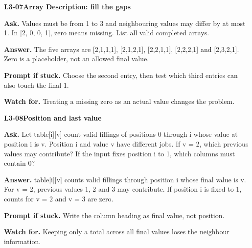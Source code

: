 \documentclass[11pt,a4paper]{article}
\begin{document}
\par\medskip
\noindent\begin{minipage}{\textwidth}
{\color{teal}\textbf{L3-07}}\quad \textbf{Array Description: fill the gaps}\par\smallskip
\textbf{Ask.} Values must be from 1 to 3 and neighbouring values may differ by at most 1. In [2, 0, 0, 1], zero means missing. List all valid completed arrays.\par\smallskip
\textbf{Answer.} The five arrays are [2,1,1,1], [2,1,2,1], [2,2,1,1], [2,2,2,1] and [2,3,2,1]. Zero is a placeholder, not an allowed final value.\par\smallskip
\textbf{Prompt if stuck.} Choose the second entry, then test which third entries can also touch the final 1.\par\smallskip
\textbf{Watch for.} Treating a missing zero as an actual value changes the problem.
\end{minipage}\par{}\medskip

\noindent\begin{minipage}{\textwidth}
{\color{teal}\textbf{L3-08}}\quad \textbf{Position and last value}\par\smallskip
\textbf{Ask.} Let table[i][v] count valid fillings of positions 0 through i whose value at position i is v. Position i and value v have different jobs. If v = 2, which previous values may contribute? If the input fixes position i to 1, which columns must contain 0?\par\smallskip
\textbf{Answer.} table[i][v] counts valid fillings through position i whose final value is v. For v = 2, previous values 1, 2 and 3 may contribute. If position i is fixed to 1, counts for v = 2 and v = 3 are zero.\par\smallskip
\textbf{Prompt if stuck.} Write the column heading as final value, not position.\par\smallskip
\textbf{Watch for.} Keeping only a total across all final values loses the neighbour information.
\end{minipage}\par{}\medskip
\end{document}
